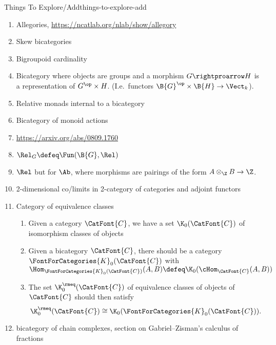 \begin{remark}{Things To Explore/Add}{things-to-explore-add}
\begin{enumerate}
\begin{enumerate}
\begin{quote}
                        However, if $\CatFont{V}$ is $*$-autonomous, then $\mathsf{Prof}_{\CatFont{V}}$ is a linear bicategory (Proposition 6.6 of \url{https://arxiv.org/abs/2209.05693}). In that case, there's probably a calculus of left/right Kan extensions/lifts one can develop. What is it?
                    \end{quote}
            \end{enumerate}
        \item Allegories, \url{https://ncatlab.org/nlab/show/allegory}
        \item Skew bicategories
        \item Bigroupoid cardinality
        \item Bicategory where objects are groups and a morphism $G\rightproarrow H$ is a representation of $G^{\op}\times H$. (I.e.\ functors $\B{G}^{\op}\times\B{H}\to\Vect_{k}$).
        \item Relative monads internal to a bicategory
        \item Bicategory of monoid actions
        \item \url{https://arxiv.org/abs/0809.1760}
        \item $\Rel_{G}\defeq\Fun(\B{G},\Rel)$
        \item $\Rel$ but for $\Ab$, where morphisms are pairings of the form $A\otimes_{\Z}B\to\Z$.
        \item 2-dimensional co/limits in 2-category of categories and adjoint functors
        \item Category of equivalence classes
            \begin{enumerate}
                \item Given a category $\CatFont{C}$, we have a set $\K_{0}(\CatFont{C})$ of isomorphism classes of objects
                \item Given a bicategory $\CatFont{C}$, there should be a category $\FontForCategories{K}_{0}(\CatFont{C})$ with $\Hom_{\FontForCategories{K}_{0}(\CatFont{C})}(A,B)\defeq\K_{0}(\cHom_{\CatFont{C}}(A,B))$
                \item The set $\K^{\rmeq}_{0}(\CatFont{C})$ of equivalence classes of objects of $\CatFont{C}$ should then satisfy
                    \[
                        \K^{\rmeq}_{0}(\CatFont{C})%
                        \cong%
                        \K_{0}(\FontForCategories{K}_{0}(\CatFont{C})).
                    \]%
            \end{enumerate}
        \item bicategory of chain complexes, section  on Gabriel--Zisman's calculus of fractions

\end{enumerate}
\end{remark}
